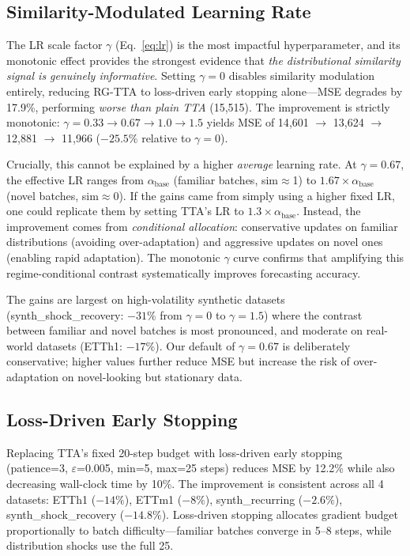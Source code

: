 \documentclass[11pt,a4paper]{article}
\begin{document}
\subsection{Similarity-Modulated Learning Rate}
\label{sec:ablation_lr}

The LR scale factor $\gamma$ (Eq.~\ref{eq:lr}) is the most impactful hyperparameter, and its monotonic effect provides the strongest evidence that \emph{the distributional similarity signal is genuinely informative}. Setting $\gamma = 0$ disables similarity modulation entirely, reducing RG-TTA to loss-driven early stopping alone---MSE degrades by 17.9\%, performing \emph{worse than plain TTA} (15{,}515). The improvement is strictly monotonic: $\gamma = 0.33 \rightarrow 0.67 \rightarrow 1.0 \rightarrow 1.5$ yields MSE of 14{,}601 $\rightarrow$ 13{,}624 $\rightarrow$ 12{,}881 $\rightarrow$ 11{,}966 ($-25.5\%$ relative to $\gamma{=}0$).

Crucially, this cannot be explained by a higher \emph{average} learning rate. At $\gamma = 0.67$, the effective LR ranges from $\alpha_{\text{base}}$ (familiar batches, sim$\approx$1) to $1.67 \times \alpha_{\text{base}}$ (novel batches, sim$\approx$0). If the gains came from simply using a higher fixed LR, one could replicate them by setting TTA's LR to $1.3 \times \alpha_{\text{base}}$. Instead, the improvement comes from \emph{conditional allocation}: conservative updates on familiar distributions (avoiding over-adaptation) and aggressive updates on novel ones (enabling rapid adaptation). The monotonic $\gamma$ curve confirms that amplifying this regime-conditional contrast systematically improves forecasting accuracy.

The gains are largest on high-volatility synthetic datasets (synth\_shock\_recovery: $-31\%$ from $\gamma{=}0$ to $\gamma{=}1.5$) where the contrast between familiar and novel batches is most pronounced, and moderate on real-world datasets (ETTh1: $-17\%$). Our default of $\gamma = 0.67$ is deliberately conservative; higher values further reduce MSE but increase the risk of over-adaptation on novel-looking but stationary data.

\subsection{Loss-Driven Early Stopping}

Replacing TTA's fixed 20-step budget with loss-driven early stopping (patience=3, $\varepsilon$=0.005, min=5, max=25 steps) reduces MSE by 12.2\% while also decreasing wall-clock time by 10\%. The improvement is consistent across all 4 datasets: ETTh1 ($-14\%$), ETTm1 ($-8\%$), synth\_recurring ($-2.6\%$), synth\_shock\_recovery ($-14.8\%$). Loss-driven stopping allocates gradient budget proportionally to batch difficulty---familiar batches converge in 5--8 steps, while distribution shocks use the full 25.
\end{document}
